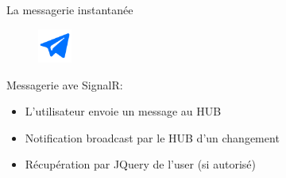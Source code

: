 \begin{frame}{La messagerie instantanée}
\begin{figure}[h!]
  \includegraphics[width=0.10\textwidth]{images/-59-512}
\end{figure}

  Messagerie ave SignalR:
  \begin{itemize}
  \item L'utilisateur envoie un message au HUB
  \item Notification broadcast par le HUB d'un changement
  \item Récupération par JQuery de l'user (si autorisé)
  \end{itemize}
\end{frame}